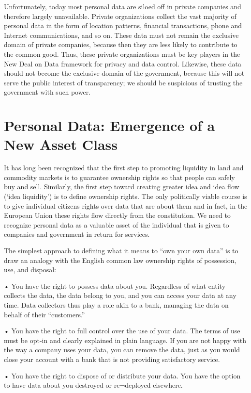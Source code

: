 Unfortunately, today most personal data are siloed off in private companies and therefore largely unavailable.
Private organizations collect the vast majority of personal data in the form of location patterns, financial transactions, phone and Internet communications, and so on.
These data must not remain the exclusive domain of private companies, because then they are less likely to contribute to the common good.
Thus, these private organizations must be key players in the New Deal on Data framework for privacy and data control.
Likewise, these data should not become the exclusive domain of the government, because this will not serve the public interest of transparency; we should be suspicious of trusting the government with such power.

\section{Personal Data: Emergence of a New Asset Class}

It has long been recognized that the first step to promoting liquidity in land and commodity markets is to guarantee ownership rights so that people can safely buy and sell.
Similarly, the first step toward creating greater idea and idea flow (`idea liquidity’) is to define ownership rights.
The only politically viable course is to give individual citizens rights over data that are about them and in fact, in the European Union these rights flow directly from the constitution.
We need to recognize personal data as a valuable asset of the individual that is given to companies and government in return for services.

The simplest approach to defining what it means to “own your own data” is to draw an analogy with the English common law ownership rights of possession, use, and disposal:

• You have the right to possess data about you. Regardless of what entity collects the data, the data belong to you, and you can access your data at any time. Data collectors thus play a role akin to a bank, managing the data on behalf of their “customers.”

• You have the right to full control over the use of your data. The terms of use must be opt-in and clearly explained in plain language. If you are not happy with the way a company uses your data, you can remove the data, just as you would close your account with a bank that is not providing satisfactory service.

• You have the right to dispose of or distribute your data. You have the option to have data about you destroyed or re¬deployed elsewhere.

